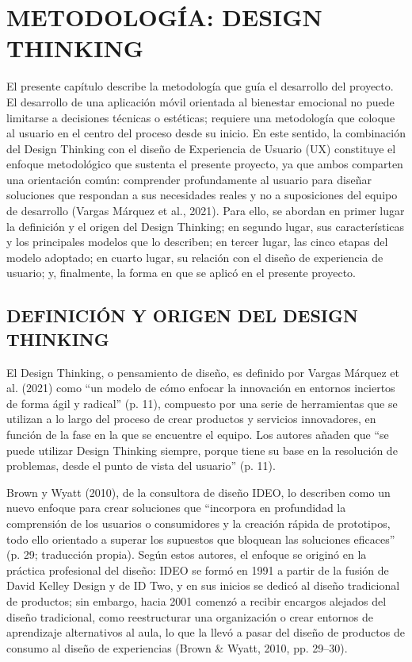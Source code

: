 \chapter{METODOLOGÍA: DESIGN THINKING}
El presente capítulo describe la metodología que guía el desarrollo del proyecto. El desarrollo de una aplicación móvil orientada al bienestar emocional no puede limitarse a decisiones técnicas o estéticas; requiere una metodología que coloque al usuario en el centro del proceso desde su inicio. En este sentido, la combinación del Design Thinking con el diseño de Experiencia de Usuario (UX) constituye el enfoque metodológico que sustenta el presente proyecto, ya que ambos comparten una orientación común: comprender profundamente al usuario para diseñar soluciones que respondan a sus necesidades reales y no a suposiciones del equipo de desarrollo (Vargas Márquez et al., 2021). Para ello, se abordan en primer lugar la definición y el origen del Design Thinking; en segundo lugar, sus características y los principales modelos que lo describen; en tercer lugar, las cinco etapas del modelo adoptado; en cuarto lugar, su relación con el diseño de experiencia de usuario; y, finalmente, la forma en que se aplicó en el presente proyecto.

\section{DEFINICIÓN Y ORIGEN DEL DESIGN THINKING}
El Design Thinking, o pensamiento de diseño, es definido por Vargas Márquez et al. (2021) como ``un modelo de cómo enfocar la innovación en entornos inciertos de forma ágil y radical'' (p. 11), compuesto por una serie de herramientas que se utilizan a lo largo del proceso de crear productos y servicios innovadores, en función de la fase en la que se encuentre el equipo. Los autores añaden que ``se puede utilizar Design Thinking siempre, porque tiene su base en la resolución de problemas, desde el punto de vista del usuario'' (p. 11).

Brown y Wyatt (2010), de la consultora de diseño IDEO, lo describen como un nuevo enfoque para crear soluciones que ``incorpora en profundidad la comprensión de los usuarios o consumidores y la creación rápida de prototipos, todo ello orientado a superar los supuestos que bloquean las soluciones eficaces'' (p. 29; traducción propia). Según estos autores, el enfoque se originó en la práctica profesional del diseño: IDEO se formó en 1991 a partir de la fusión de David Kelley Design y de ID Two, y en sus inicios se dedicó al diseño tradicional de productos; sin embargo, hacia 2001 comenzó a recibir encargos alejados del diseño tradicional, como reestructurar una organización o crear entornos de aprendizaje alternativos al aula, lo que la llevó a pasar del diseño de productos de consumo al diseño de experiencias (Brown \& Wyatt, 2010, pp. 29--30).

